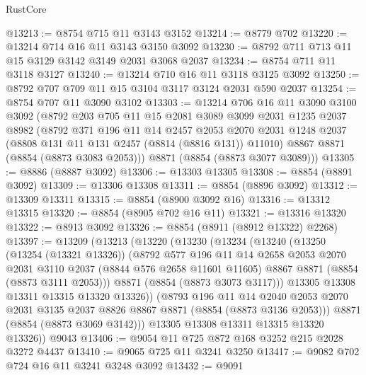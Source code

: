 \begin{lexlean}{RustCore}
\begin{coremodule}
@13213 := @8754 @715 @11 @3143 @3152
@13214 := @8779 @702
@13220 := @13214 @714 @16 @11 @3143 @3150 @3092
@13230 := @8792 @711 @713 @11 @15 @3129 @3142 @3149 @2031 @3068 @2037
@13234 := @8754 @711 @11 @3118 @3127
@13240 := @13214 @710 @16 @11 @3118 @3125 @3092
@13250 := @8792 @707 @709 @11 @15 @3104 @3117 @3124 @2031 @590 @2037
@13254 := @8754 @707 @11 @3090 @3102
@13303 := @13214
    @706
    @16
    @11
    @3090
    @3100
    @3092
    (@8792
      @203
      @705
      @11
      @15
      @2081
      @3089
      @3099
      @2031
      @1235
      @2037
      @8982
      (@8792
        @371
        @196
        @11
        @14
        @2457
        @2053
        @2070
        @2031
        @1248
        @2037
        (@8808 @131 @11 @131 @2457 (@8814 (@8816 @131)) @11010)
        @8867
        @8871
        (@8854 (@8873 @3083 @2053)))
      @8871
      (@8854 (@8873 @3077 @3089)))
@13305 := @8886 (@8887 @3092)
@13306 := @13303 @13305
@13308 := @8854 (@8891 @3092)
@13309 := @13306 @13308
@13311 := @8854 (@8896 @3092)
@13312 := @13309 @13311
@13315 := @8854 (@8900 @3092 @16)
@13316 := @13312 @13315
@13320 := @8854 (@8905 @702 @16 @11)
@13321 := @13316 @13320
@13322 := @8913 @3092
@13326 := @8854 (@8911 (@8912 @13322) @2268)
@13397 := @13209
    (@13213
      (@13220
        (@13230
          (@13234
            (@13240
              (@13250
                (@13254 (@13321 @13326))
                (@8792
                  @577
                  @196
                  @11
                  @14
                  @2658
                  @2053
                  @2070
                  @2031
                  @3110
                  @2037
                  (@8844 @576 @2658 @11601 @11605)
                  @8867
                  @8871
                  (@8854 (@8873 @3111 @2053)))
                @8871
                (@8854 (@8873 @3073 @3117)))
              @13305
              @13308
              @13311
              @13315
              @13320
              @13326))
          (@8793
            @196
            @11
            @14
            @2040
            @2053
            @2070
            @2031
            @3135
            @2037
            @8826
            @8867
            @8871
            (@8854 (@8873 @3136 @2053)))
          @8871
          (@8854 (@8873 @3069 @3142)))
        @13305
        @13308
        @13311
        @13315
        @13320
        @13326))
    @9043
@13406 := @9054 @11 @725 @872 @168 @3252 @215 @2028 @3272 @4437
@13410 := @9065 @725 @11 @3241 @3250
@13417 := @9082 @702 @724 @16 @11 @3241 @3248 @3092
@13432 := @9091

\end{coremodule}
\end{lexlean}
